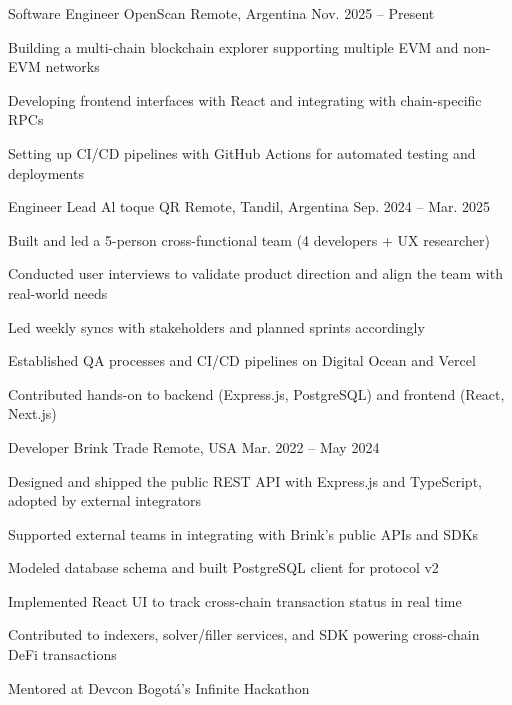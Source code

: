 
\begin{cventries}
\cventry
{Software Engineer} %
{OpenScan} %
{Remote, Argentina} %
{Nov. 2025 – Present}
{
\begin{cvitems}
\item {Building a multi-chain blockchain explorer supporting multiple EVM and non-EVM networks}
\item {Developing frontend interfaces with React and integrating with chain-specific RPCs}
\item {Setting up CI/CD pipelines with GitHub Actions for automated testing and deployments}
\end{cvitems}
}

\cventry
{Engineer Lead} %
{Al toque QR} %
{Remote, Tandil, Argentina} %
{Sep. 2024 – Mar. 2025}
{
\begin{cvitems}
\item {Built and led a 5-person cross-functional team (4 developers + UX researcher)}
\item {Conducted user interviews to validate product direction and align the team with real-world needs}
\item {Led weekly syncs with stakeholders and planned sprints accordingly}
\item {Established QA processes and CI/CD pipelines on Digital Ocean and Vercel}
\item {Contributed hands-on to backend (Express.js, PostgreSQL) and frontend (React, Next.js)}
\end{cvitems}
}

\cventry
{Developer} %
{Brink Trade} %
{Remote, USA} %
{Mar. 2022 – May 2024}
{
\begin{cvitems}
\item {Designed and shipped the public REST API with Express.js and TypeScript, adopted by external integrators}
\item {Supported external teams in integrating with Brink's public APIs and SDKs}
\item {Modeled database schema and built PostgreSQL client for protocol v2}
\item {Implemented React UI to track cross-chain transaction status in real time}
\item {Contributed to indexers, solver/filler services, and SDK powering cross-chain DeFi transactions}
\item {Mentored at Devcon Bogotá's Infinite Hackathon}
\end{cvitems}
}


\end{cventries}
